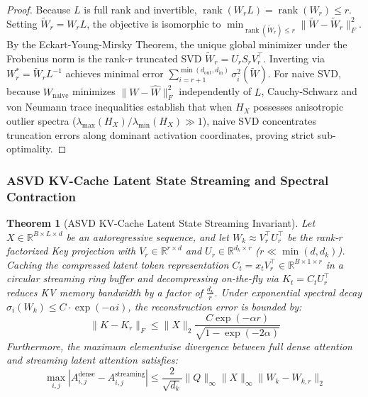 \documentclass{article}
\newtheorem{theorem}{Theorem}
\begin{document}
\begin{proof}
Because $L$ is full rank and invertible, $\operatorname{rank}(W_r L) = \operatorname{rank}(W_r) \le r$. Setting $\widetilde{W}_r = W_r L$, the objective is isomorphic to $\min_{\operatorname{rank}(\widetilde{W}_r) \le r} \|\widetilde{W} - \widetilde{W}_r\|_F^2$. By the Eckart-Young-Mirsky Theorem, the unique global minimizer under the Frobenius norm is the rank-$r$ truncated SVD $\widetilde{W}_r = U_r S_r V_r^\top$. Inverting via $W_r^* = \widetilde{W}_r L^{-1}$ achieves minimal error $\sum_{i=r+1}^{\min(d_{\text{out}}, d_{\text{in}})} \sigma_i^2(\widetilde{W})$. For naive SVD, because $W_{\text{naive}}$ minimizes $\|W - \hat{W}\|_F^2$ independently of $L$, Cauchy-Schwarz and von Neumann trace inequalities establish that when $H_X$ possesses anisotropic outlier spectra ($\lambda_{\max}(H_X) / \lambda_{\min}(H_X) \gg 1$), naive SVD concentrates truncation errors along dominant activation coordinates, proving strict sub-optimality.
\end{proof}

\subsubsection{ASVD KV-Cache Latent State Streaming and Spectral Contraction}
\begin{theorem}[ASVD KV-Cache Latent State Streaming Invariant]
\label{thm:asvd_kv_cache_proof}
Let $X \in \mathbb{R}^{B \times L \times d}$ be an autoregressive sequence, and let $W_k \approx V_r^\top U_r^\top$ be the rank-$r$ factorized Key projection with $V_r \in \mathbb{R}^{r \times d}$ and $U_r \in \mathbb{R}^{d_k \times r}$ ($r \ll \min(d, d_k)$). Caching the compressed latent token representation $C_t = x_t V_r^\top \in \mathbb{R}^{B \times 1 \times r}$ in a circular streaming ring buffer and decompressing on-the-fly via $K_t = C_t U_r^\top$ reduces KV memory bandwidth by a factor of $\frac{d_k}{r}$.
Under exponential spectral decay $\sigma_i(W_k) \le C \cdot \exp(-\alpha i)$, the reconstruction error is bounded by:
\begin{equation}
    \|K - K_r\|_F \le \|X\|_2 \frac{C \exp(-\alpha r)}{\sqrt{1 - \exp(-2\alpha)}}
\end{equation}
Furthermore, the maximum elementwise divergence between full dense attention and streaming latent attention satisfies:
\begin{equation}
    \max_{i, j} |A_{i, j}^{\text{dense}} - A_{i, j}^{\text{streaming}}| \le \frac{2}{\sqrt{d_k}} \|Q\|_\infty \|X\|_\infty \|W_k - W_{k, r}\|_2
\end{equation}
\end{theorem}
\end{document}
